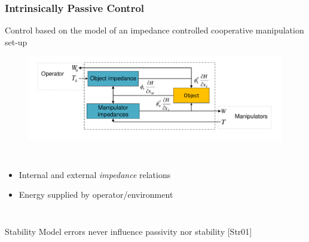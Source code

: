 \documentclass[student]{ITRslides}
\begin{document}
\begin{frame}
	\frametitle{Intrinsically Passive Control}
	\begin{block}{}
	Control based on the model of an impedance controlled cooperative manipulation set-up
	\end{block}
 \begin{figure}[htb]
 \vspace{-15pt}
			\centering
			\includegraphics[width=1\textwidth]{IPCscheme.pdf}
\vspace{-30pt}
\end{figure}
\begin{columns}[t]
			
	
		\begin{itemize}
			\item Internal and external \emph{impedance} relations
			\item Energy supplied by operator/environment
		\end{itemize}

		
%
		
			
		\end{columns}
					\begin{block}{Stability}
Model errors never influence passivity nor stability \nocite{Stramigioli_01}{\tiny [Str01]} 
	\end{block}
\end{frame}
\end{document}
